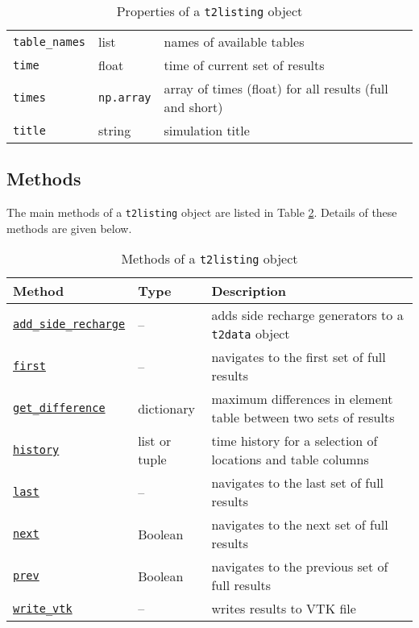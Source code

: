 \begin{table}
\begin{center}
\begin{tabular}{|l|l|p{70mm}|}
      \texttt{table\_names} & list & names of available tables\\
      \texttt{time} & float & time of current set of results\\
      \texttt{times} & \texttt{np.array} & array of times (float) for all results (full and short)\\
      \texttt{title} & string & simulation title\\
      \hline
    \end{tabular}
    \caption{Properties of a \texttt{t2listing} object}
    \label{tb:t2listing_properties}
  \end{center}
\end{table}

\subsection{Methods}
\label{t2listingmethods}

The main methods of a \texttt{t2listing} object are listed in Table \ref{tb:t2listing_methods}.  Details of these methods are given below.

\begin{table}
  \begin{center}
    \begin{tabular}{|l|l|p{80mm}|}
      \hline
      \textbf{Method} & \textbf{Type} & \textbf{Description}\\
      \hline
      \hyperref[sec:t2listing:add_side_recharge]{\texttt{add\_side\_recharge}} & -- & adds side recharge generators to a \texttt{t2data} object\\
      \hyperref[sec:t2listing:first]{\texttt{first}} & -- & navigates to the first set of full results\\
      \hyperref[sec:t2listing:get_difference]{\texttt{get\_difference}} & dictionary & maximum differences in element table between two sets of results\\
      \hyperref[sec:t2listing:history]{\texttt{history}} & list or tuple & time history for a selection of locations and table columns\\
      \hyperref[sec:t2listing:last]{\texttt{last}} & -- & navigates to the last set of full results\\
      \hyperref[sec:t2listing:next]{\texttt{next}} & Boolean & navigates to the next set of full results\\
      \hyperref[sec:t2listing:prev]{\texttt{prev}} & Boolean & navigates to the previous set of full results\\
      \hyperref[sec:t2listing:write_vtk]{\texttt{write\_vtk}} & -- & writes results to VTK file\\
      \hline
    \end{tabular}
    \caption{Methods of a \texttt{t2listing} object}
    \label{tb:t2listing_methods}
  \end{center}
\end{table}

